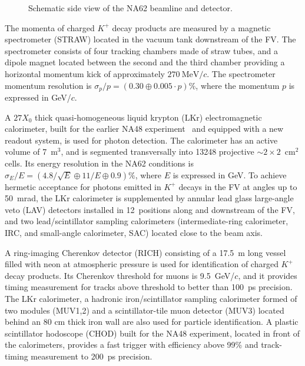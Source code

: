 \documentclass[11pt]{article}
\begin{document}
\begin{figure}[t]
\begin{center}
%
\end{center}
\vspace{-13mm}
\caption{Schematic side view of the NA62 beamline and detector.}
\label{fig:detector}
\end{figure}



The momenta of charged $K^+$ decay products are measured by a magnetic spectrometer (STRAW) located in the vacuum tank downstream of the FV. The spectrometer consists of four tracking chambers made of straw tubes, and a dipole magnet located between the second and the third chamber providing a horizontal momentum kick of approximately $270~\mathrm{MeV}/c$. The spectrometer momentum resolution is $\sigma_p/p = (0.30\oplus 0.005\cdot p)\%$, where the momentum $p$ is expressed in GeV/$c$.

A $27X_0$ thick quasi-homogeneous liquid krypton (LKr) electromagnetic calorimeter, built for the earlier NA48 experiment~\cite{na48-detector} and equipped with a new readout system, is used for photon detection. The calorimeter has an active volume of 7~m$^3$, and is segmented transversally into 13248 projective $\sim\!2\!\times\!2$~cm$^2$ cells. Its energy resolution in the NA62 conditions is $\sigma_E/E=(4.8/\sqrt{E}\oplus11/E\oplus0.9)\%$, where $E$ is expressed in GeV. To achieve hermetic acceptance for photons emitted in $K^+$ decays in the FV at angles up to 50~mrad, the LKr calorimeter is supplemented by annular lead glass large-angle veto (LAV) detectors installed in 12~positions along and downstream of the FV, and two lead/scintillator sampling calorimeters (intermediate-ring calorimeter, IRC, and small-angle calorimeter, SAC) located close to the beam axis.

A ring-imaging Cherenkov detector (RICH) consisting of a 17.5~m long vessel filled with neon at atmospheric pressure is used for identification of charged $K^+$ decay products. Its Cherenkov threshold for muons is 9.5~GeV/$c$, and it provides timing measurement for tracks above threshold to better than 100~ps precision. The LKr calorimeter, a hadronic iron/scintillator sampling calorimeter formed of two modules (MUV1,2) and a scintillator-tile muon detector (MUV3) located behind an 80 cm thick iron wall are also used for particle identification. A plastic scintillator hodoscope (CHOD) built for the NA48 experiment, located in front of the calorimeters, provides a fast trigger with efficiency above 99\% and track-timing measurement to 200~ps precision.
\end{document}
